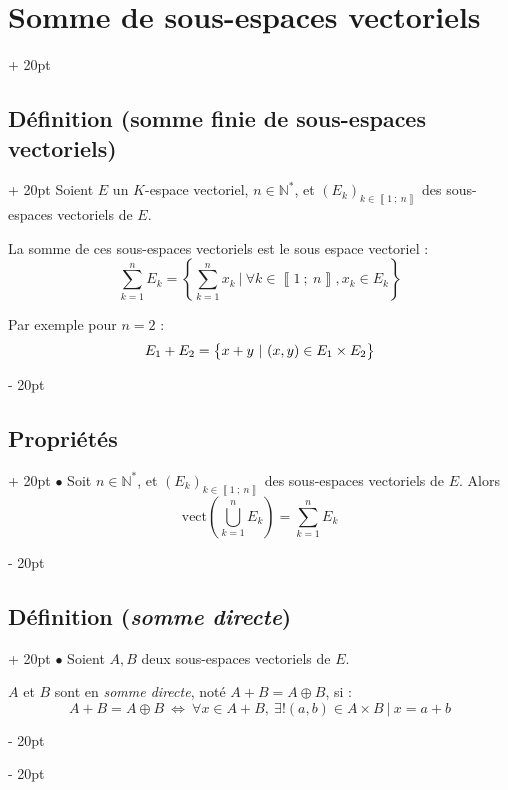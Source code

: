 \documentclass[a4paper, 12pt, twoside]{article}
\newcommand{\N}{\mathbb{N}} %
\newcommand{\nset}[2]{\left\llbracket #1\ ;\ #2 \right\rrbracket}
\newcommand{\lr}[1]{\left( #1 \right)}
\newcommand{\set}[1]{\left\{ #1 \right\}}
\newcommand{\ssi}{\ \Leftrightarrow \ }
\newcommand{\ind}[1][20pt]{\advance\leftskip + #1}
\newcommand{\deind}[1][20pt]{\advance\leftskip - #1}
\newenvironment{indt}[2][20pt]{#2 \par \ind[#1]}{\par \deind} %
\begin{document}
    \vspace{12pt}
    
    \begin{indt}{\section{Somme de sous-espaces vectoriels}}
        
        \begin{indt}{\subsection{Définition (somme finie de sous-espaces vectoriels)}}
            Soient $E$ un $K$-espace vectoriel, $n \in \N^*$, et $(E_k)_{k \in \nset 1 n}$ des sous-espaces vectoriels de $E$.
            
            La somme de ces sous-espaces vectoriels est le sous espace vectoriel :
                \[ \sum_{k = 1}^n E_k = \set{ \sum_{k = 1}^n x_k\ |\ \forall k \in \nset 1 n, x_k \in E_k } \]
            
            Par exemple pour $n = 2$ :
                \[ E_1 + E_2 = \set{x + y\ |\ (x, y) \in E_1 \times E_2 \vphantom{\tfrac a a}} \]
        \end{indt}
        
        \vspace{12pt}
        
        \begin{indt}{\subsection{Propriétés}}
            $\bullet$ Soit $n \in \N^*$, et $(E_k)_{k \in \nset 1 n}$ des sous-espaces vectoriels de $E$. Alors
                \[ \mathrm{vect}\lr{\bigcup_{k = 1}^n E_k} = \sum_{k = 1}^n E_k \]
        \end{indt}
        
        \vspace{12pt}
        
        \begin{indt}{\subsection{Définition (\textit{somme directe})}}
            $\bullet$ Soient $A, B$ deux sous-espaces vectoriels de $E$.
            
            $A$ et $B$ sont en \textit{somme directe}, noté $A + B = A \oplus B$, si :
                \[ A + B = A \oplus B \ssi \forall x \in A + B,\ \exists! (a, b) \in A \times B\ |\ x = a + b \]
            

\end{indt}
\end{indt}
\end{document}
